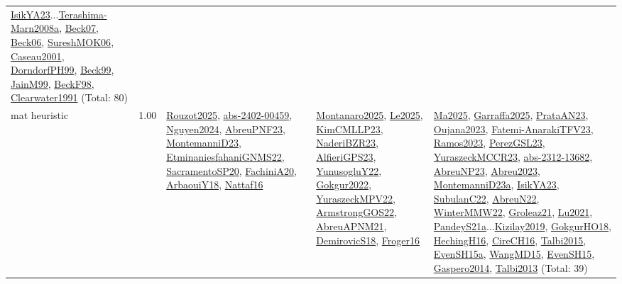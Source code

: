 {\begin{longtable}{p{3cm}r>{\raggedright\arraybackslash}p{6cm}>{\raggedright\arraybackslash}p{6cm}>{\raggedright\arraybackslash}p{8cm}}
\hyperref[detail:IsikYA23]{IsikYA23}...\hyperref[detail:Terashima-Marn2008a]{Terashima-Marn2008a}, \hyperref[detail:Beck07]{Beck07}, \hyperref[detail:Beck06]{Beck06}, \hyperref[detail:SureshMOK06]{SureshMOK06}, \hyperref[detail:Caseau2001]{Caseau2001}, \hyperref[detail:DorndorfPH99]{DorndorfPH99}, \hyperref[detail:Beck99]{Beck99}, \hyperref[detail:JainM99]{JainM99}, \hyperref[detail:BeckF98]{BeckF98}, \hyperref[detail:Clearwater1991]{Clearwater1991} (Total: 80)\\
\index{mat heuristic}\index{Algorithms!mat heuristic}mat heuristic &  1.00 & \hyperref[detail:Rouzot2025]{Rouzot2025}, \hyperref[detail:abs-2402-00459]{abs-2402-00459}, \hyperref[detail:Nguyen2024]{Nguyen2024}, \hyperref[detail:AbreuPNF23]{AbreuPNF23}, \hyperref[detail:MontemanniD23]{MontemanniD23}, \hyperref[detail:EtminaniesfahaniGNMS22]{EtminaniesfahaniGNMS22}, \hyperref[detail:SacramentoSP20]{SacramentoSP20}, \hyperref[detail:FachiniA20]{FachiniA20}, \hyperref[detail:ArbaouiY18]{ArbaouiY18}, \hyperref[detail:Nattaf16]{Nattaf16} & \hyperref[detail:Montanaro2025]{Montanaro2025}, \hyperref[detail:Le2025]{Le2025}, \hyperref[detail:KimCMLLP23]{KimCMLLP23}, \hyperref[detail:NaderiBZR23]{NaderiBZR23}, \hyperref[detail:AlfieriGPS23]{AlfieriGPS23}, \hyperref[detail:YunusogluY22]{YunusogluY22}, \hyperref[detail:Gokgur2022]{Gokgur2022}, \hyperref[detail:YuraszeckMPV22]{YuraszeckMPV22}, \hyperref[detail:ArmstrongGOS22]{ArmstrongGOS22}, \hyperref[detail:AbreuAPNM21]{AbreuAPNM21}, \hyperref[detail:DemirovicS18]{DemirovicS18}, \hyperref[detail:Froger16]{Froger16} & \hyperref[detail:Ma2025]{Ma2025}, \hyperref[detail:Garraffa2025]{Garraffa2025}, \hyperref[detail:PrataAN23]{PrataAN23}, \hyperref[detail:Oujana2023]{Oujana2023}, \hyperref[detail:Fatemi-AnarakiTFV23]{Fatemi-AnarakiTFV23}, \hyperref[detail:Ramos2023]{Ramos2023}, \hyperref[detail:PerezGSL23]{PerezGSL23}, \hyperref[detail:YuraszeckMCCR23]{YuraszeckMCCR23}, \hyperref[detail:abs-2312-13682]{abs-2312-13682}, \hyperref[detail:AbreuNP23]{AbreuNP23}, \hyperref[detail:Abreu2023]{Abreu2023}, \hyperref[detail:MontemanniD23a]{MontemanniD23a}, \hyperref[detail:IsikYA23]{IsikYA23}, \hyperref[detail:SubulanC22]{SubulanC22}, \hyperref[detail:AbreuN22]{AbreuN22}, \hyperref[detail:WinterMMW22]{WinterMMW22}, \hyperref[detail:Groleaz21]{Groleaz21}, \hyperref[detail:Lu2021]{Lu2021}, \hyperref[detail:PandeyS21a]{PandeyS21a}...\hyperref[detail:Kizilay2019]{Kizilay2019}, \hyperref[detail:GokgurHO18]{GokgurHO18}, \hyperref[detail:HechingH16]{HechingH16}, \hyperref[detail:CireCH16]{CireCH16}, \hyperref[detail:Talbi2015]{Talbi2015}, \hyperref[detail:EvenSH15a]{EvenSH15a}, \hyperref[detail:WangMD15]{WangMD15}, \hyperref[detail:EvenSH15]{EvenSH15}, \hyperref[detail:Gaspero2014]{Gaspero2014}, \hyperref[detail:Talbi2013]{Talbi2013} (Total: 39)\\

\end{longtable}}
